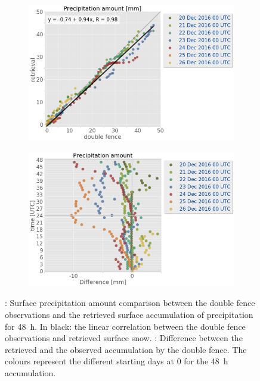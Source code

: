 \begin{figure}[!t]
	\centering
	\begin{subfigure}[b]{0.38\textwidth}
		\includegraphics[trim={0.cm 0.cm 13cm 0cm},clip,
		width=\textwidth]{./fig_obs_ret/obs_ret_20161220_26_00}
		\caption{}\label{fig:res:obs_ret_scatter}
	\end{subfigure}
	\begin{subfigure}[b]{0.59\textwidth}
		\includegraphics[trim={0.cm 0.cm 0cm 0cm},clip,
		width=\textwidth]{./fig_obs_ret/diff_20161220_26_00}
		\caption{}\label{fig:res:diff_ret_scatter}
	\end{subfigure}
	\caption{\protect{}: Surface precipitation amount comparison between the double fence observations and the retrieved surface accumulation of precipitation for \SI{48}{\hour}. In black: the linear correlation between the double fence observations and retrieved surface snow. 
		\protect{}: Difference between the retrieved and the observed accumulation by the double fence. The colours represent the different starting days at \SI{0}{\UTC} for the \SI{48}{\hour} accumulation.}\label{fig:res:obs_ret}
\end{figure}
